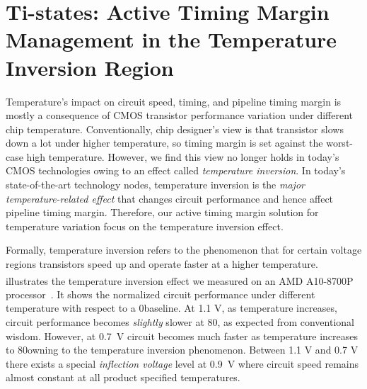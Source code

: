 
\chapter{Ti-states: Active Timing Margin Management in the Temperature Inversion Region}
\label{sec:temperature}

Temperature's impact on circuit speed, timing, and pipeline timing margin is mostly a consequence of CMOS transistor performance variation under different chip temperature. Conventionally, chip designer's view is that transistor slows down a lot under higher temperature, so timing margin is set against the worst-case high temperature. However, we find this view no longer holds in today's CMOS technologies owing to an effect called \textit{temperature inversion}. In today's state-of-the-art technology nodes, temperature inversion is the \textit{major temperature-related effect} that changes circuit performance and hence affect pipeline timing margin. Therefore, our active timing margin solution for temperature variation focus on the temperature inversion effect.

Formally, temperature inversion refers to the phenomenon that for certain voltage regions transistors speed up and operate faster at a higher temperature.  illustrates the temperature inversion effect we measured on an AMD\textsuperscript{\textregistered} A10-8700P processor~\cite{munger2016carrizo}. It shows the normalized circuit performance under different temperature with respect to a 0\C baseline. At 1.1 V, as temperature increases, circuit performance becomes \textit{slightly} slower at 80\C, as expected from conventional wisdom. However, at 0.7~V circuit becomes much faster as temperature increases to 80\C owning to the temperature inversion phenomenon. Between 1.1 V and 0.7 V there exists a special {\it inflection voltage} level at 0.9~V where circuit speed remains almost constant at all product specified temperatures. 

